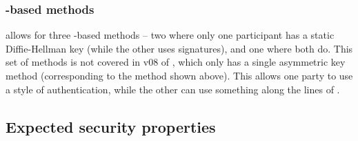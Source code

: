 \subsubsection{\mStat-based methods}
\mEdhoc allows for three \mStat-based methods -- two where only one participant has a static Diffie-Hellman key (while the other uses signatures), and one where both do. This set of methods is not covered in v08 of \mEdhoc, which only has a single \mSigma asymmetric key method (corresponding to the \mSigSig method shown above). This allows one party to use a \mSigma style of authentication, while the other can use something along the lines of \mOptls.




\subsection{Expected security properties}




